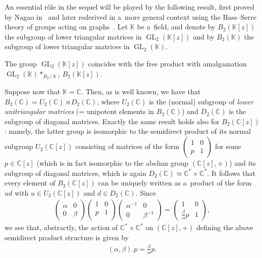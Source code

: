 \documentclass[pdftex]{sigma}
\newcommand{\bb}[1]{\mathbb{#1}}
\newcommand{\smm}[1]{\left(\begin{smallmatrix} #1\end{smallmatrix}\right)}
\DeclareMathOperator{\GL}{GL}
\begin{document}
An essential r\^ole in the sequel will be played by the following result, f\/irst proved by Nagao
in~\cite{naga59} and later rederived in a~more general context using the Bass--Serre theory of groups acting
on graphs~\cite{serre80}.
Let \(\bb{K}\) be a~f\/ield, and denote by \(B_{2}(\bb{K}[z])\) the subgroup of lower triangular matrices
in \(\GL_{2}(\bb{K}[z])\) and by \(B_{2}(\bb{K})\) the subgroup of lower triangular matrices in
\(\GL_{2}(\bb{K})\).
\begin{theorem}[Nagao]
\label{teo:nagao}
The group \(\GL_{2}(\bb{K}[z])\) coincides with the free product with amalgamation
\(\GL_{2}(\bb{K})\ast_{B_{2}(\bb{K})} B_{2}(\bb{K}[z])\).
\end{theorem}
Suppose now that \(\bb{K}=\bb{C}\).
Then, as is well known, we have that \(B_{2}(\bb{C}) = U_{2}(\bb{C})\rtimes D_{2}(\bb{C})\), where
\(U_{2}(\bb{C})\) is the (normal) subgroup of \emph{lower unitriangular matrices} (= unipotent elements in
\(B_{2}(\bb{C})\)) and \(D_{2}(\bb{C})\) is the subgroup of diagonal matrices.
Exactly the same result holds also for \(B_{2}(\bb{C}[z])\): namely, the latter group is isomorphic to the
semidirect product of its normal subgroup \(U_{2}(\bb{C}[z])\) consisting of matrices of the form \(\smm{1
& 0
\\
p & 1}\) for some \(p\in \bb{C}[z]\) (which is in fact isomorphic to the abelian group \((\bb{C}[z],+)\))
and its subgroup of diagonal matrices, which is again \(D_{2}(\bb{C})\simeq \bb{C}^{*}\times \bb{C}^{*}\).
It follows that every element of \(B_{2}(\bb{C}[z])\) can be uniquely written as a~product of the form
\(ud\) with \(u\in U_{2}(\bb{C}[z])\) and \(d\in D_{2}(\bb{C})\).
Since
\begin{gather*}
\begin{pmatrix}
\alpha&0
\\
0&\beta
\end{pmatrix}
\begin{pmatrix}
1&0
\\
p&1
\\
\end{pmatrix}
\begin{pmatrix}
\alpha^{-1}&0
\\
0&\beta^{-1}
\end{pmatrix}
=
\begin{pmatrix}
1&0
\\
\frac{\beta}{\alpha}p&1
\end{pmatrix},
\end{gather*}
we see that, abstractly, the action of \(\bb{C}^{*}\times \bb{C}^{*}\) on \((\bb{C}[z],+)\) def\/ining the
above semidirect product structure is given by
\begin{gather}
\label{eq:smdp-act}
(\alpha,\beta).p=\frac{\beta}{\alpha}p.
\end{gather}
\end{document}
